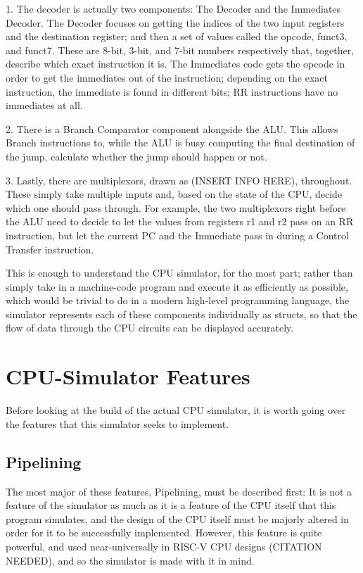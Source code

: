 \documentclass[12pt,twoside]{reedthesis}
\begin{document}
1. The decoder is actually two components: The Decoder and the Immediates Decoder. The Decoder focuses on getting the indices of the two input registers and the destination register; and then a set of values called the opcode, funct3, and funct7. These are 8-bit, 3-bit, and 7-bit numbers respectively that, together, describe which exact instruction it is. The Immediates code gets the opcode in order to get the immediates out of the instruction; depending on the exact instruction, the immediate is found in different bits; RR instructions have no immediates at all.

2. There is a Branch Comparator component alongside the ALU. This allows Branch instructions to, while the ALU is busy computing the final destination of the jump, calculate whether the jump should happen or not.

3. Lastly, there are multiplexors, drawn as (INSERT INFO HERE), throughout. These simply take multiple inputs and, based on the state of the CPU, decide which one should pass through. For example, the two multiplexors right before the ALU need to decide to let the values from registers r1 and r2 pass on an RR instruction, but let the current PC and the Immediate pass in during a Control Transfer instruction.

This is enough to understand the CPU simulator, for the most part; rather than simply take in a machine-code program and execute it as efficiently as possible, which would be trivial to do in a modern high-level programming language, the simulator represents each of these components individually as structs, so that the flow of data through the CPU circuits can be displayed accurately.

\chapter*{CPU-Simulator Features}

Before looking at the build of the actual CPU simulator, it is worth going over the features that this simulator seeks to implement.

\section{Pipelining}

The most major of these features, Pipelining, must be described first: It is not a feature of the simulator as much as it is a feature of the CPU itself that this program simulates, and the design of the CPU itself must be majorly altered in order for it to be successfully implemented. However, this feature is quite powerful, and used near-universally in RISC-V CPU designs (CITATION NEEDED), and so the simulator is made with it in mind.
\end{document}
